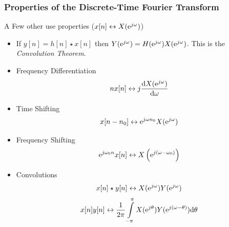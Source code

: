 \documentclass[mathserif,9pt]{beamer}
\def\d{\mathrm{d}}
\begin{document}
\begin{frame}\frametitle{Properties of the Discrete-Time Fourier Transform}\small
  \begin{block}{\small A Few other use properties ($x[n] \leftrightarrow X({\textrm{e}}^{j\omega})$)}
    \begin{itemize}
      \item If $y[n] = h[n] \star x[n]$ then $Y({\textrm{e}}^{j\omega}) = H({\textrm{e}}^{j\omega}) X({\textrm{e}}^{j\omega})$. This is the {\em Convolution Theorem}. 
      \item {\color{blue!50!black}Frequency Differentiation}%
        \begin{align}
          n x[n] \leftrightarrow j \frac{\d X(\e^{j\omega})}{\d\omega}
          \nonumber
        \end{align}
      \item {\color{blue!50!black}Time Shifting}
        \begin{align}
          x[n-n_0] \leftrightarrow {\textrm{e}}^{j\omega n_0} X({\textrm{e}}^{j\omega})
          \nonumber
        \end{align}
      \item {\color{blue!50!black}Frequency Shifting} 
        \begin{align}
          {\textrm{e}}^{j\omega_0 n} x[n] \leftrightarrow  X\left({\textrm{e}}^{j(\omega - \omega_0)}\right)
          \nonumber
        \end{align}
      \item {\color{blue!50!black}Convolutions} 
        \begin{align}
          x[n] \star y[n] \leftrightarrow  X({\textrm{e}}^{j\omega}) Y({\textrm{e}}^{j\omega})  \nonumber
        \end{align}
        \begin{align}
          x[n] y[n] \leftrightarrow  \frac{1}{2\pi}\int\limits_{-\pi}^{\pi} X(\e^{j\theta}) Y(\e^{j(\omega - \theta)})\d\theta \nonumber
          \nonumber
        \end{align}
    \end{itemize}
  \end{block}
\end{frame}
\end{document}
